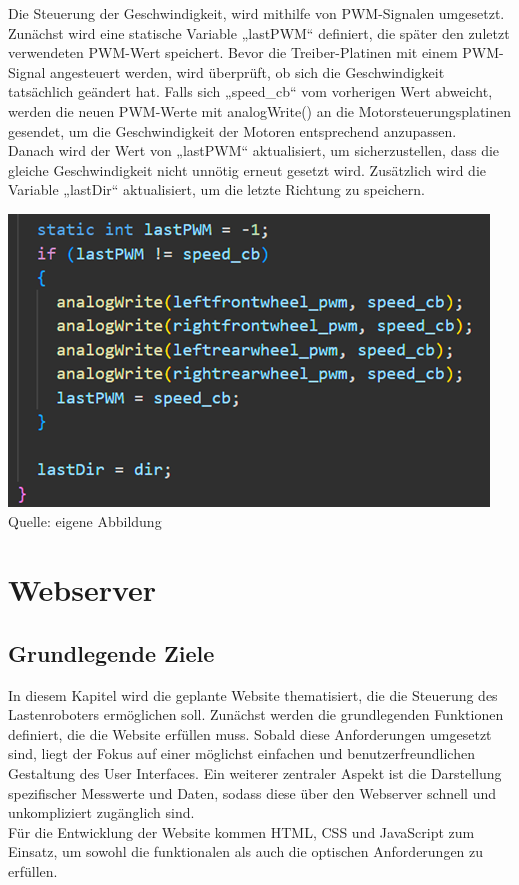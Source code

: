 \documentclass[ngerman,12pt,a4paper]{article}
\begin{document}
	Die Steuerung der Geschwindigkeit, wird mithilfe von PWM-Signalen umgesetzt. Zunächst wird eine statische Variable „lastPWM“ definiert, die später den zuletzt verwendeten PWM-Wert speichert. Bevor die Treiber-Platinen mit einem PWM-Signal angesteuert werden, wird überprüft, ob sich die Geschwindigkeit tatsächlich geändert hat. Falls sich „speed\_cb“ vom vorherigen Wert abweicht, werden die neuen PWM-Werte mit analogWrite() an die Motorsteuerungsplatinen gesendet, um die Geschwindigkeit der Motoren entsprechend anzupassen. \\
	\newpage 	\noindent
	Danach wird der Wert von „lastPWM“ aktualisiert, um sicherzustellen, dass die gleiche Geschwindigkeit nicht unnötig erneut gesetzt wird. Zusätzlich wird die Variable „lastDir“ aktualisiert, um die letzte Richtung zu speichern. \\[0.5cm]
	\begin{minipage}{\textwidth}
		\centering
		\includegraphics[scale=1.2]{Pictures/code_analogWrite_pwm_motoren}
		\label{fig:code_analogWrite_pwm_motoren}
		\vspace{-2pt}
		\small Quelle: eigene Abbildung
		\vspace{10pt}
	\end{minipage}
	\newpage
	\section{Webserver} %
		\subsection{Grundlegende Ziele}
	In diesem Kapitel wird die geplante Website thematisiert, die die Steuerung des Lastenroboters ermöglichen soll. Zunächst werden die grundlegenden Funktionen definiert, die die Website erfüllen muss. Sobald diese Anforderungen umgesetzt sind, liegt der Fokus auf einer möglichst einfachen und benutzerfreundlichen Gestaltung des User Interfaces. Ein weiterer zentraler Aspekt ist die Darstellung spezifischer Messwerte und Daten, sodass diese über den Webserver schnell und unkompliziert zugänglich sind. \\[0.5cm]
	Für die Entwicklung der Website kommen HTML, CSS und JavaScript zum Einsatz, um sowohl die funktionalen als auch die optischen Anforderungen zu erfüllen. 
	
\end{document}
